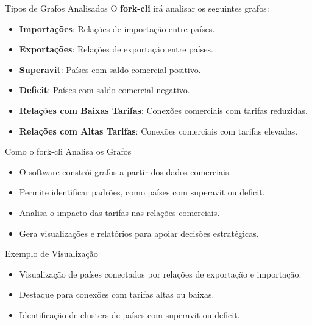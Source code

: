 \begin{frame}{Tipos de Grafos Analisados}
  O \textbf{fork-cli} irá analisar os seguintes grafos:
  \begin{itemize}
    \item \textbf{Importações}: Relações de importação entre países.
    \item \textbf{Exportações}: Relações de exportação entre países.
    \item \textbf{Superavit}: Países com saldo comercial positivo.
    \item \textbf{Deficit}: Países com saldo comercial negativo.
    \item \textbf{Relações com Baixas Tarifas}: Conexões comerciais com tarifas reduzidas.
    \item \textbf{Relações com Altas Tarifas}: Conexões comerciais com tarifas elevadas.
  \end{itemize}
\end{frame}

\begin{frame}{Como o fork-cli Analisa os Grafos}
  \begin{itemize}
    \item O software constrói grafos a partir dos dados comerciais.
    \item Permite identificar padrões, como países com superavit ou deficit.
    \item Analisa o impacto das tarifas nas relações comerciais.
    \item Gera visualizações e relatórios para apoiar decisões estratégicas.
  \end{itemize}
\end{frame}

\begin{frame}{Exemplo de Visualização}
  \begin{itemize}
    \item Visualização de países conectados por relações de exportação e importação.
    \item Destaque para conexões com tarifas altas ou baixas.
    \item Identificação de clusters de países com superavit ou deficit.
  \end{itemize}
\end{frame}
